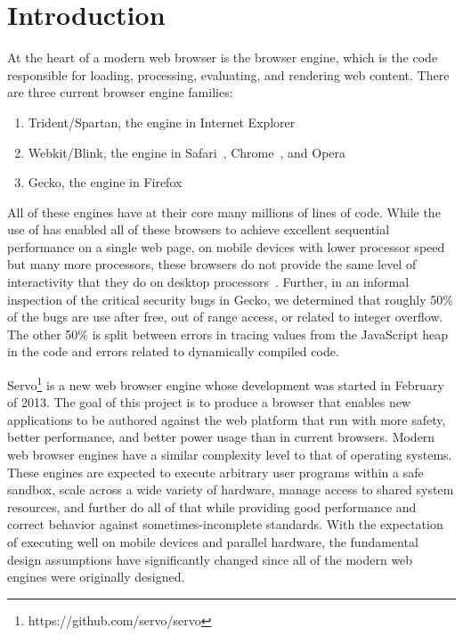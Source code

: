 
\section{Introduction}
\label{sec:intro}
At the heart of a modern web browser is the browser engine, which is the code responsible
for loading, processing, evaluating, and rendering web content.
There are three current browser engine families:
\begin{enumerate}
\item Trident/Spartan, the engine in Internet Explorer~\cite{IE}
\item Webkit\cite{WEBKIT}/Blink, the engine in Safari~\cite{SAFARI}, Chrome~\cite{CHROME}, and Opera~\cite{OPERA}
\item Gecko, the engine in Firefox~\cite{FIREFOX}
\end{enumerate}
All of these engines have at their core many millions of lines of \Cplusplus code.
While the use of \Cplusplus has enabled all of these browsers to achieve excellent sequential
performance on a single web page, on mobile devices with lower processor speed but many
more processors, these browsers do not provide the same level of interactivity that they
do on desktop processors~\cite{parallelizing-web-pages,ZOOMM}.
Further, in an informal inspection of the critical security bugs in Gecko, we determined that
roughly 50\% of the bugs are use after free, out of range access, or related to integer
overflow.
The other 50\% is split between errors in tracing values from the JavaScript heap in the
\Cplusplus code and errors related to dynamically compiled code.

Servo\footnote{https://github.com/servo/servo} is a new web browser engine whose development
was started in February of 2013.
The goal of this project is to produce a browser that enables new applications to be authored
against the web platform that run with more safety, better performance, and better power usage
than in current browsers.
Modern web browser engines have a similar complexity level to that of operating systems.
These engines are expected to execute arbitrary user programs within a safe sandbox, scale 
across a wide variety of hardware, manage access to shared system resources, and further 
do all of that while providing good performance and correct behavior
against sometimes-incomplete standards.
With the expectation of executing well on mobile devices and parallel hardware, the 
fundamental design assumptions have significantly changed since all of the modern
web engines were originally designed.



